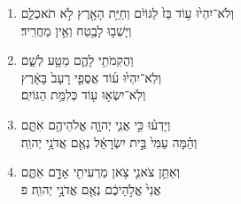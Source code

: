 \documentclass[12pt,a4paper,titlepage]{article}
\def \pslabelsep{-0.9em} %
\def \psleftmargin{0em} %
\begin{document}
\begin{enumerate}[leftmargin=\psleftmargin, labelsep = \pslabelsep, label={\arabic*}, font=\color{\pscolor}\small\textsuperscript, parsep=0em, itemsep=0em, topsep=0em ]
\item \texthebrew{וְלֹא־יִהְי֙וּ ע֥וֹד בַּז֙ לַגּוֹיִ֔ם וְחַיַּ֥ת הָאָ֖רֶץ לֹ֣א תֹאכְלֵ֑ם \\ וְיָשְׁב֥וּ לָבֶ֖טַח וְאֵ֥ין מַחֲרִֽיד׃}
\item \texthebrew{וַהֲקִמֹתִ֥י לָהֶ֛ם מַטָּ֖ע לְשֵׁ֑ם \\ וְלֹֽא־יִהְי֙וּ ע֜וֹד אֲסֻפֵ֤י רָעָב֙ בָּאָ֔רֶץ \\ וְלֹֽא־יִשְׂא֥וּ ע֖וֹד כְּלִמַּ֥ת הַגּוֹיִֽם׃}
\item \texthebrew{וְיָדְע֗וּ כִּ֣י אֲנִ֧י יְהוָ֛ה אֱלֹהֵיהֶ֖ם אִתָּ֑ם \\ וְהֵ֗מָּה עַמִּי֙ בֵּ֣ית יִשְׂרָאֵ֔ל נְאֻ֖ם אֲדֹנָ֥י יְהוִֽה׃}
\item \texthebrew{וְאַתֵּ֥ן צֹאנִ֛י צֹ֥אן מַרְעִיתִ֖י אָדָ֣ם אַתֶּ֑ם \\ אֲנִי֙ אֱלֹ֣הֵיכֶ֔ם נְאֻ֖ם אֲדֹנָ֥י יְהוִֽה׃ פ}
\end{enumerate}
\newpage
\end{document}
